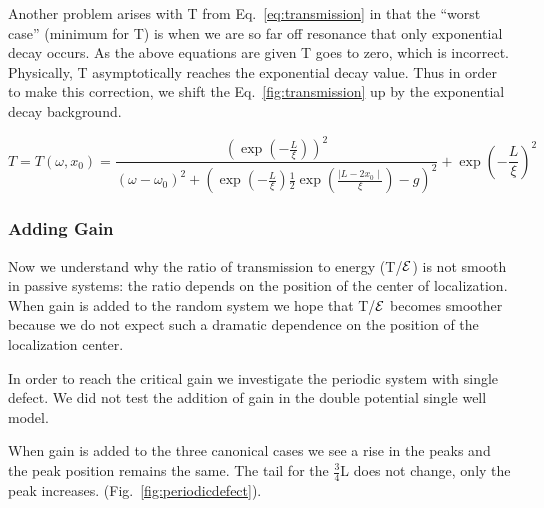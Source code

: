 Another problem arises with T from Eq.~\ref{eq:transmission} in 
that the ``worst case'' (minimum for T) is when we are so far off resonance
that only exponential decay occurs. As the above equations are given
T goes to zero, which is incorrect. Physically, T asymptotically reaches the exponential
decay value. Thus in order to make this correction, we shift the 
Eq.~\ref{fig:transmission} up by the exponential decay background.

\begin{equation}
T = T(\omega, x_0) = \frac{(\exp(-\frac{L}{\xi}))^2}{
(\omega-\omega _0)^2 + (\exp(-\frac{L}{\xi})\frac{1}{2}\exp(\frac{\mid L-2 x_0 \mid}{\xi})-g)^2
} + \exp\left(-\frac{L}{\xi}\right)^2
\label{fig:correctedtransmission}
\end{equation}

\subsubsection {Adding Gain}

Now we understand why the ratio of transmission to energy (T/${\cal E}$) is not smooth in passive systems: the ratio depends on the position of the center of localization. When gain is added to the random system we hope that T/${\cal E}$ becomes smoother because we do not expect such a dramatic dependence on the position of the localization center.

In order to reach the critical gain we investigate the periodic system with single defect. We did not test the addition of gain in the double potential single well model.

When gain is added to the three canonical cases we see a rise in the peaks and the peak position remains the same. The tail for the $ \frac{3}{4} $L does not change, only the peak increases.  (Fig.~\ref{fig:periodicdefect}).

